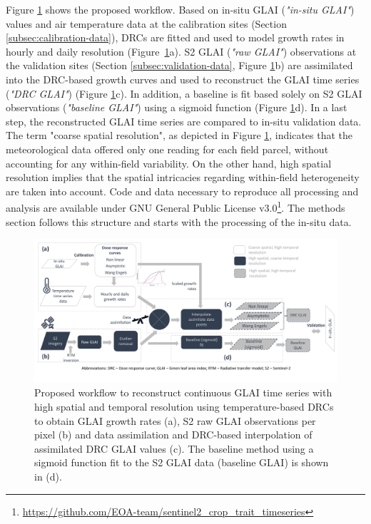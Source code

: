 Figure \ref{fig:workflow-glai-time-series} shows the proposed workflow. Based on in-situ \gls{GLAI} (\textit{"in-situ GLAI"}) values and air temperature data at the calibration sites (Section \ref{subsec:calibration-data}), \gls{DRC}s are fitted and used to model growth rates in hourly and daily resolution (Figure~\ref{fig:workflow-glai-time-series}a). \gls{S2} \gls{GLAI} (\textit{"raw GLAI"}) observations at the validation sites (Section \ref{subsec:validation-data}, Figure \ref{fig:workflow-glai-time-series}b) are assimilated into the \gls{DRC}-based growth curves and used to reconstruct the \gls{GLAI} time series (\textit{"DRC GLAI"}) (Figure \ref{fig:workflow-glai-time-series}c). In addition, a baseline is fit based solely on \gls{S2} \gls{GLAI} observations (\textit{"baseline GLAI"}) using a sigmoid function (Figure \ref{fig:workflow-glai-time-series}d). In a last step, the reconstructed \gls{GLAI} time series are compared to in-situ validation data. The term "coarse spatial resolution", as depicted in Figure \ref{fig:workflow-glai-time-series}, indicates that the meteorological data offered only one reading for each field parcel, without accounting for any within-field variability. On the other hand, high spatial resolution implies that the spatial intricacies regarding within-field heterogeneity are taken into account. Code and data necessary to reproduce all processing and analysis are available under GNU General Public License v3.0\footnote{\url{https://github.com/EOA-team/sentinel2_crop_trait_timeseries}}. The methods section follows this structure and starts with the processing of the in-situ data.

\begin{figure}[H]
    \centering
    \includegraphics[width=1.0\textwidth]{06-DRC/img/workflow_glai_ts_reconstruction.pdf}
    \caption{Proposed workflow to reconstruct continuous \gls{GLAI} time series with high spatial and temporal resolution using temperature-based \gls{DRC}s to obtain \gls{GLAI} growth rates (a), \gls{S2} raw \gls{GLAI} observations per pixel (b) and data assimilation and \gls{DRC}-based interpolation of assimilated \gls{DRC} \gls{GLAI} values (c). The baseline method using a sigmoid function fit to the \gls{S2} \gls{GLAI} data (baseline \gls{GLAI}) is shown in (d).}
    \label{fig:workflow-glai-time-series}
\end{figure}


